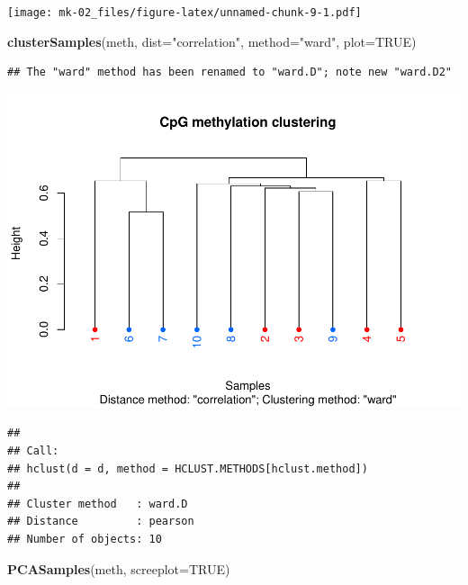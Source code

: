 \documentclass[]{article}
\newenvironment{Shaded}{\begin{snugshade}}{\end{snugshade}}
\newcommand{\KeywordTok}[1]{\textcolor[rgb]{0.13,0.29,0.53}{\textbf{#1}}}
\newcommand{\DataTypeTok}[1]{\textcolor[rgb]{0.13,0.29,0.53}{#1}}
\newcommand{\StringTok}[1]{\textcolor[rgb]{0.31,0.60,0.02}{#1}}
\newcommand{\OtherTok}[1]{\textcolor[rgb]{0.56,0.35,0.01}{#1}}
\newcommand{\NormalTok}[1]{#1}
\begin{document}
\texttt{[image: mk-02\_files/figure-latex/unnamed-chunk-9-1.pdf]}

\begin{Shaded}
\begin{Highlighting}[]
\KeywordTok{clusterSamples}\NormalTok{(meth, }\DataTypeTok{dist=}\StringTok{"correlation"}\NormalTok{, }\DataTypeTok{method=}\StringTok{"ward"}\NormalTok{, }\DataTypeTok{plot=}\OtherTok{TRUE}\NormalTok{)}
\end{Highlighting}
\end{Shaded}

\begin{verbatim}
## The "ward" method has been renamed to "ward.D"; note new "ward.D2"
\end{verbatim}

\includegraphics{mk-02_files/figure-latex/unnamed-chunk-10-1.pdf}

\begin{verbatim}
## 
## Call:
## hclust(d = d, method = HCLUST.METHODS[hclust.method])
## 
## Cluster method   : ward.D 
## Distance         : pearson 
## Number of objects: 10
\end{verbatim}

\begin{Shaded}
\begin{Highlighting}[]
\KeywordTok{PCASamples}\NormalTok{(meth, }\DataTypeTok{screeplot=}\OtherTok{TRUE}\NormalTok{)}
\end{Highlighting}
\end{Shaded}
\end{document}
